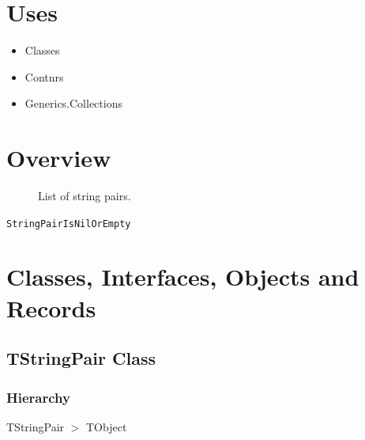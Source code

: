 \documentclass{report}
\newif\ifpdf
\begin{document}
\section{Uses}
\begin{itemize}
\item \begin{ttfamily}Classes\end{ttfamily}\item \begin{ttfamily}Contnrs\end{ttfamily}\item \begin{ttfamily}Generics.Collections\end{ttfamily}\end{itemize}
\section{Overview}
\begin{description}
\item[\texttt{\begin{ttfamily}TStringPair\end{ttfamily} Class}]
\item[\texttt{\begin{ttfamily}TStringPairVector\end{ttfamily} Class}]List of string pairs.
\end{description}
\begin{description}
\item[\texttt{StringPairIsNilOrEmpty}]
\end{description}
\section{Classes, Interfaces, Objects and Records}
\ifpdf
\subsection*{\large{\textbf{TStringPair Class}}\normalsize\hspace{1ex}\hrulefill}
\else
\subsection*{TStringPair Class}
\fi
\label{PasDoc_StringPairVector.TStringPair}
\subsubsection*{\large{\textbf{Hierarchy}}\normalsize\hspace{1ex}\hfill}
TStringPair {$>$} TObject
\end{document}
